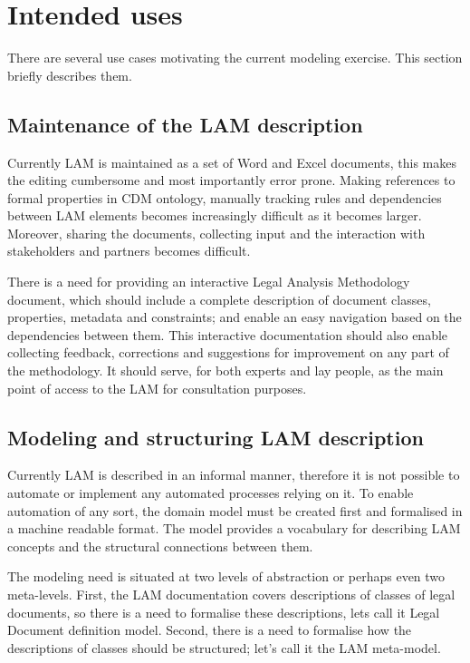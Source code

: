 
\section{Intended uses}\label{ariaid-title5}

There are several use cases motivating the current modeling exercise.
This section briefly describes them.

\subsection{Maintenance of the LAM
description}\label{maintenance-of-the-lam-description}

Currently LAM is maintained as a set of Word and Excel documents, this
makes the editing cumbersome and most importantly error prone. Making
references to formal properties in CDM ontology, manually tracking rules
and dependencies between LAM elements becomes increasingly difficult as
it becomes larger. Moreover, sharing the documents, collecting input and
the interaction with stakeholders and partners becomes difficult.

There is a need for providing an interactive Legal
Analysis Methodology document, which should include a complete description of
document classes, properties, metadata and constraints; and enable an
easy navigation based on the dependencies between them. This interactive
documentation should also enable collecting feedback, corrections and
suggestions for improvement on any part of the methodology. It should serve, for both experts and lay people, as the main point of access to the LAM for consultation purposes. 

\subsection{Modeling and structuring LAM
description}\label{modelling-and-structuring-lam-description}

Currently LAM is described in an informal manner, therefore it is not
possible to automate or implement any automated processes relying on it.
To enable automation of any sort, the domain model must be created
first and formalised in a machine readable format. The model provides a
vocabulary for describing LAM concepts and the structural connections
between them.

The modeling need is situated at two levels of abstraction or perhaps
even two meta-levels. First, the LAM documentation covers descriptions
of classes of legal documents, so there is a need to formalise these
descriptions, lets call it Legal Document definition model. Second,
there is a need to formalise how the descriptions of classes should be
structured; let's call it the LAM meta-model.

